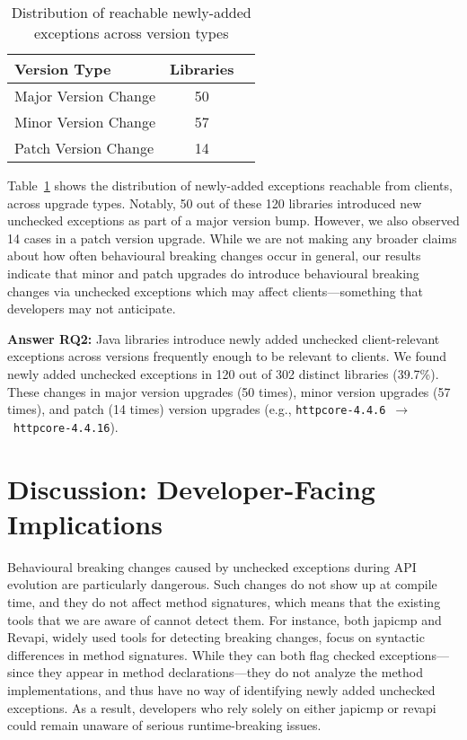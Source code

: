 \begin{table}[h]
\centering
\caption{Distribution of reachable newly-added exceptions across version types}
\label{tab:version-distribution}
\begin{tabular}{lcc}
\toprule
\textbf{Version Type} & \textbf{Libraries} \\
\midrule
Major Version Change & 50 \\
Minor Version Change & 57 \\
Patch Version Change & 14 \\
\bottomrule
\end{tabular}
\end{table}

Table~\ref{tab:version-distribution} shows the distribution of newly-added exceptions reachable from clients, across upgrade types. Notably, 50 out of these 120 libraries introduced new unchecked exceptions as part of a major version bump. However, we also observed 14 cases in a patch version upgrade. While we are not making any broader claims about how often behavioural breaking changes occur in general, our results indicate that minor and patch upgrades do introduce behavioural breaking changes via unchecked exceptions which may affect clients—something that developers may not anticipate.

\vspace{1em}
\begin{tcolorbox}[colback=gray!10, colframe=black]
\textbf{Answer RQ2:} Java libraries introduce newly added unchecked client-relevant exceptions across versions frequently enough to be relevant to clients. We found newly added unchecked exceptions in 120 out of 302 distinct libraries (39.7\%). These changes in major version upgrades (50 times), minor version upgrades (57 times), and patch (14 times) version upgrades (e.g., \texttt{httpcore-4.4.6}~$\rightarrow$~\texttt{httpcore-4.4.16}).
\end{tcolorbox}
\vspace{1em}

\section{Discussion: Developer-Facing Implications}

Behavioural breaking changes caused by unchecked exceptions during API evolution are particularly dangerous. Such changes do not show up at compile time, and they do not affect method signatures, which means that the existing tools that we are aware of cannot detect them. For instance, both japicmp and Revapi, widely used tools for detecting breaking changes, focus on syntactic differences in method signatures. While they can both flag checked exceptions—since they appear in method declarations—they do not analyze the method implementations, and thus have no way of identifying newly added unchecked exceptions. As a result, developers who rely solely on either japicmp or revapi could remain unaware of serious runtime-breaking issues.


